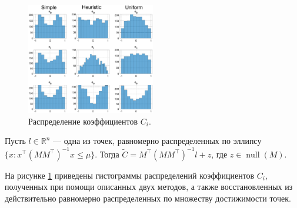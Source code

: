 \documentclass[../main.tex]{subfiles}
\begin{document}
    \begin{figure}[ht]
  	\centering
  	\includegraphics[width=0.5\textwidth]{images/three_coefficients_distribution.eps}
  	\caption{Распределение коэффициентов $C_i$.}
  	\label{fig:ap:three_coefficients_distribution}
  \end{figure}
  
  Пусть $l\in \mathbb{R}^{n}$ --- одна из точек, равномерно распределенных по эллипсу $\{x: x^{\top} (M M^{\top})^{-1} x \leqslant \mu \}$.
  Тогда $\widetilde{C} = M^{\top} (M M^{\top})^{-1} l + z$, где $z \in \operatorname{null}(M)$.
  
  На рисунке \ref{fig:ap:three_coefficients_distribution} приведены гистограммы распределений коэффициентов $C_i$, полученных при помощи описанных двух методов, а также восстановленных из действительно равномерно распределенных по множеству достижимости точек. 
  
\end{document}

